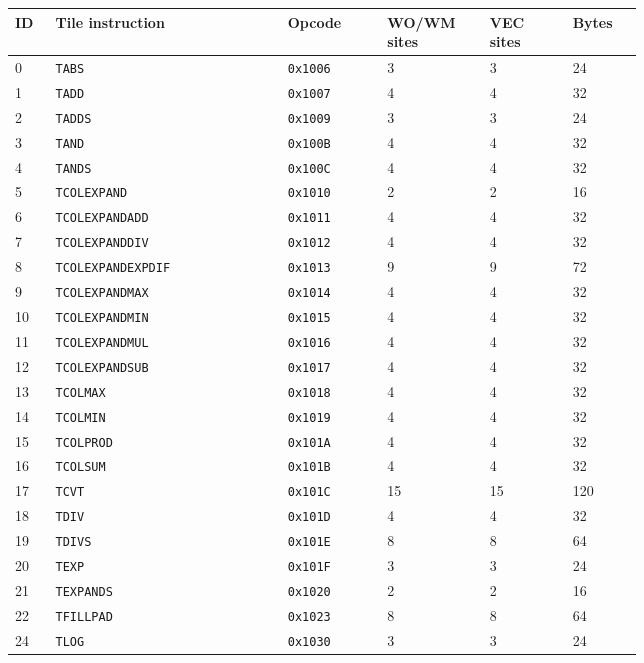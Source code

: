 {\scriptsize
\begin{longtable}{@{}R{0.045\linewidth}L{0.29\linewidth}L{0.12\linewidth}R{0.10\linewidth}R{0.10\linewidth}R{0.08\linewidth}@{}}
\toprule
ID & Tile instruction & Opcode & WO/WM sites & VEC sites & Bytes \\
 & \texttt{TABS} & \texttt{0x1006} & 3 & 3 & 24 \\
1 & \texttt{TADD} & \texttt{0x1007} & 4 & 4 & 32 \\
2 & \texttt{TADDS} & \texttt{0x1009} & 3 & 3 & 24 \\
3 & \texttt{TAND} & \texttt{0x100B} & 4 & 4 & 32 \\
4 & \texttt{TANDS} & \texttt{0x100C} & 4 & 4 & 32 \\
5 & \texttt{TCOLEXPAND} & \texttt{0x1010} & 2 & 2 & 16 \\
6 & \texttt{TCOLEXPANDADD} & \texttt{0x1011} & 4 & 4 & 32 \\
7 & \texttt{TCOLEXPANDDIV} & \texttt{0x1012} & 4 & 4 & 32 \\
8 & \texttt{TCOLEXPANDEXPDIF} & \texttt{0x1013} & 9 & 9 & 72 \\
9 & \texttt{TCOLEXPANDMAX} & \texttt{0x1014} & 4 & 4 & 32 \\
10 & \texttt{TCOLEXPANDMIN} & \texttt{0x1015} & 4 & 4 & 32 \\
11 & \texttt{TCOLEXPANDMUL} & \texttt{0x1016} & 4 & 4 & 32 \\
12 & \texttt{TCOLEXPANDSUB} & \texttt{0x1017} & 4 & 4 & 32 \\
13 & \texttt{TCOLMAX} & \texttt{0x1018} & 4 & 4 & 32 \\
14 & \texttt{TCOLMIN} & \texttt{0x1019} & 4 & 4 & 32 \\
15 & \texttt{TCOLPROD} & \texttt{0x101A} & 4 & 4 & 32 \\
16 & \texttt{TCOLSUM} & \texttt{0x101B} & 4 & 4 & 32 \\
17 & \texttt{TCVT} & \texttt{0x101C} & 15 & 15 & 120 \\
18 & \texttt{TDIV} & \texttt{0x101D} & 4 & 4 & 32 \\
19 & \texttt{TDIVS} & \texttt{0x101E} & 8 & 8 & 64 \\
20 & \texttt{TEXP} & \texttt{0x101F} & 3 & 3 & 24 \\
21 & \texttt{TEXPANDS} & \texttt{0x1020} & 2 & 2 & 16 \\
22 & \texttt{TFILLPAD} & \texttt{0x1023} & 8 & 8 & 64 \\
24 & \texttt{TLOG} & \texttt{0x1030} & 3 & 3 & 24 \\

\end{longtable}}
